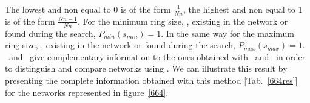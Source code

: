 The lowest and non equal to 0 is of the form $\frac{1}{Nn}$, the highest and non equal to 1 is of the form $\frac{Nn-1}{Nn}$. 
For the minimum ring size, \smin, existing in the network or found during the search, $P_{min}(s_{min})=1$. 
In the same way for the maximum ring size, \smax, existing in the network or found during the search, $P_{max}(s_{max})=1$. \\
\pmax\ and \pmin\ give complementary information to the ones obtained with \rpc\ and \pnr\ in order to distinguish and compare networks using \rstat. 
We can illustrate this result by presenting the complete information obtained with this method [Tab.~\ref{664res}] for the networks represented in figure~\ref{664}. 
